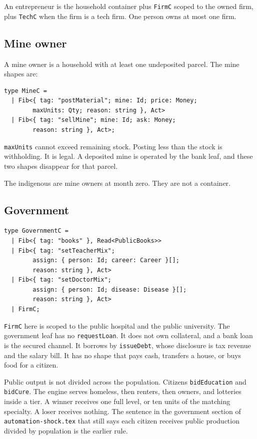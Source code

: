 \documentclass[11pt]{article}
\newenvironment{keep}{\noindent\begin{minipage}{\linewidth}}{\end{minipage}}
\begin{document}
An entrepreneur is the household container plus \texttt{FirmC} scoped to the
owned firm, plus \texttt{TechC} when the firm is a tech firm. One person owns
at most one firm.

\subsection{Mine owner}

A mine owner is a household with at least one undeposited parcel. The mine
shapes are:

\begin{keep}
\begin{lstlisting}
type MineC =
  | Fib<{ tag: "postMaterial"; mine: Id; price: Money;
        maxUnits: Qty; reason: string }, Act>
  | Fib<{ tag: "sellMine"; mine: Id; ask: Money;
        reason: string }, Act>;
\end{lstlisting}
\end{keep}

\texttt{maxUnits} cannot exceed remaining stock. Posting less than the stock
is withholding. It is legal. A deposited mine is operated by the bank leaf,
and these two shapes disappear for that parcel.

The indigenous are mine owners at month zero. They are not a container.

\subsection{Government}

\begin{keep}
\begin{lstlisting}
type GovernmentC =
  | Fib<{ tag: "books" }, Read<PublicBooks>>
  | Fib<{ tag: "setTeacherMix";
        assign: { person: Id; career: Career }[];
        reason: string }, Act>
  | Fib<{ tag: "setDoctorMix";
        assign: { person: Id; disease: Disease }[];
        reason: string }, Act>
  | FirmC;
\end{lstlisting}
\end{keep}

\texttt{FirmC} here is scoped to the public hospital and the public
university. The government leaf has no \texttt{requestLoan}. It does not own
collateral, and a bank loan is the secured channel. It borrows by
\texttt{issueDebt}, whose disclosure is tax revenue and the salary bill.
It has no shape that pays cash, transfers a house, or buys food for a
citizen.

Public output is not divided across the population. Citizens
\texttt{bidEducation} and \texttt{bidCure}. The engine serves homeless, then
renters, then owners, and lotteries inside a tier. A winner receives one full
level, or ten units of the matching specialty. A loser receives nothing.
The sentence in the government section of \texttt{automation-shock.tex} that
still says each citizen receives public production divided by population is
the earlier rule.
\end{document}
